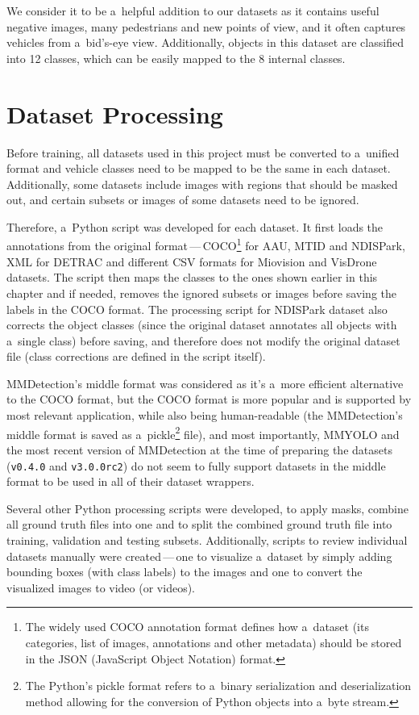 We consider it to be a~helpful addition to our datasets as it contains useful
negative images, many pedestrians and new points of view, and it often captures
vehicles from a~bid's-eye view. Additionally, objects in this dataset are
classified into 12 classes, which can be easily mapped to the 8
internal classes.


\section{Dataset Processing}

Before training, all datasets used in this project must be converted to
a~unified format and vehicle classes need to be mapped to be the same in each dataset.
Additionally, some datasets include images with regions that should be masked
out, and certain subsets or images of some datasets need to be ignored.

Therefore, a~Python script was developed for each dataset. It first loads the
annotations from the original format\,---\,COCO\footnote{The widely used COCO
annotation format defines how a~dataset (its categories, list of images,
annotations and other metadata) should be stored in the JSON (JavaScript Object
Notation) format.} for AAU, MTID
and NDISPark, XML for DETRAC and different CSV formats for Miovision and VisDrone datasets.
The script then maps the classes to the ones shown earlier in this chapter and if
needed, removes the ignored subsets or images before saving the labels in the
COCO format. The processing script for NDISPark dataset also corrects the object
classes (since the original dataset annotates all objects with a~single class)
before saving, and therefore does not modify the original dataset file (class
corrections are defined in the script itself).

MMDetection's middle format was considered as it's a~more efficient alternative
to the COCO format, but the COCO format is more popular and is supported by most
relevant application, while also being human-readable (the MMDetection's middle
format is saved as a~pickle\footnote{The Python's pickle format refers to
a~binary serialization and deserialization method allowing for the conversion of
Python objects into a~byte stream.} file), and most importantly, MMYOLO and the
most recent version of MMDetection at the time of preparing the datasets
(\texttt{v0.4.0} and \texttt{v3.0.0rc2}) do not seem to fully support datasets
in the middle format to be used in all of their dataset wrappers.

Several other Python processing scripts were developed, to apply masks, combine
all ground truth files into one and to split the combined ground truth file into
training, validation and testing subsets. Additionally, scripts to review
individual datasets manually were created\,---\,one to visualize a~dataset by simply
adding bounding boxes (with class labels) to the images and one to convert the
visualized images to video (or videos).


